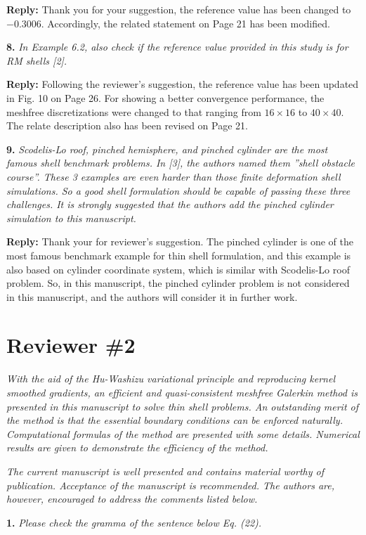 \documentclass{article}
\begin{document}
\textbf{Reply:} Thank you for your suggestion, the reference value has been changed to $-0.3006$. Accordingly, the related statement on Page 21 has been modified.

\textbf{8.} \textit{In Example 6.2, also check if the reference value provided in this study is for RM shells [2].}

\textbf{Reply:} Following the reviewer's suggestion, the reference value has been updated in Fig. 10 on Page 26. For showing a better convergence performance, the meshfree discretizations were changed to that ranging from $16\times16$ to $40\times40$. The relate description also has been revised on Page 21. 

\textbf{9.} \textit{Scodelis-Lo roof, pinched hemisphere, and pinched cylinder are the most famous shell benchmark problems. In [3], the authors named them ”shell obstacle course”. These 3 examples are even harder than those finite deformation shell simulations. So a good shell formulation should be capable of passing these three challenges. It is strongly suggested that the authors add the pinched cylinder simulation to this manuscript.}

\textbf{Reply:} Thank your for reviewer's suggestion. The pinched cylinder is one of the most famous benchmark example for thin shell formulation, and this example is also based on cylinder coordinate system, which is similar with Scodelis-Lo roof problem. So, in this manuscript, the pinched cylinder problem is not considered in this manuscript, and the authors will consider it in further work.

\section*{Reviewer \#2}
\textit{With the aid of the Hu-Washizu variational principle and reproducing kernel smoothed gradients, an efficient and quasi-consistent meshfree Galerkin method is presented in this manuscript to solve thin shell problems. An outstanding merit of the method is that the essential boundary conditions can be enforced naturally. Computational formulas of the method are presented with some details. Numerical results are given to demonstrate the efficiency of the method.}

\textit{The current manuscript is well presented and contains material worthy of publication. Acceptance of the manuscript is recommended. The authors are, however, encouraged to address the comments listed below.}

\textbf{1.} \textit{Please check the gramma of the sentence below Eq. (22).}
\end{document}
